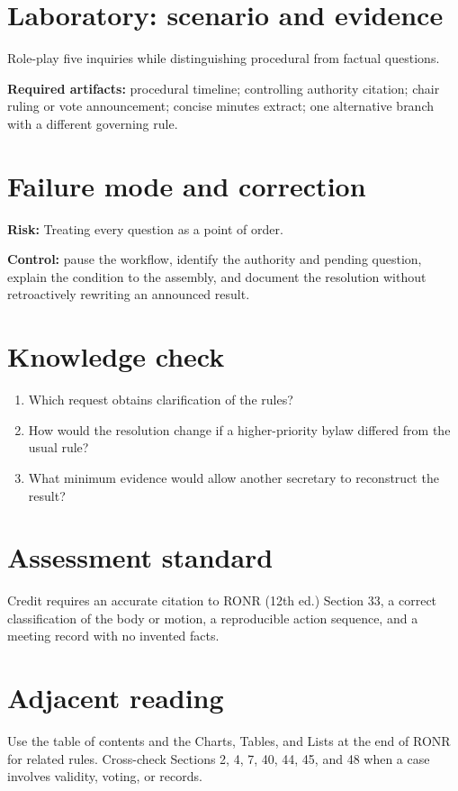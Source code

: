 \documentclass[11pt]{article}
\begin{document}
\section{Laboratory: scenario and evidence}
Role-play five inquiries while distinguishing procedural from factual questions.

\textbf{Required artifacts:} procedural timeline; controlling authority citation; chair ruling or vote announcement; concise minutes extract; one alternative branch with a different governing rule.

\section{Failure mode and correction}
\textbf{Risk:} Treating every question as a point of order.

\textbf{Control:} pause the workflow, identify the authority and pending question, explain the condition to the assembly, and document the resolution without retroactively rewriting an announced result.

\section{Knowledge check}
\begin{enumerate}[leftmargin=*,itemsep=4pt]
\item Which request obtains clarification of the rules?
\item How would the resolution change if a higher-priority bylaw differed from the usual rule?
\item What minimum evidence would allow another secretary to reconstruct the result?
\end{enumerate}

\section{Assessment standard}
Credit requires an accurate citation to RONR (12th ed.) Section 33, a correct classification of the body or motion, a reproducible action sequence, and a meeting record with no invented facts.

\section{Adjacent reading}
Use the table of contents and the Charts, Tables, and Lists at the end of RONR for related rules. Cross-check Sections 2, 4, 7, 40, 44, 45, and 48 when a case involves validity, voting, or records.
\end{document}
